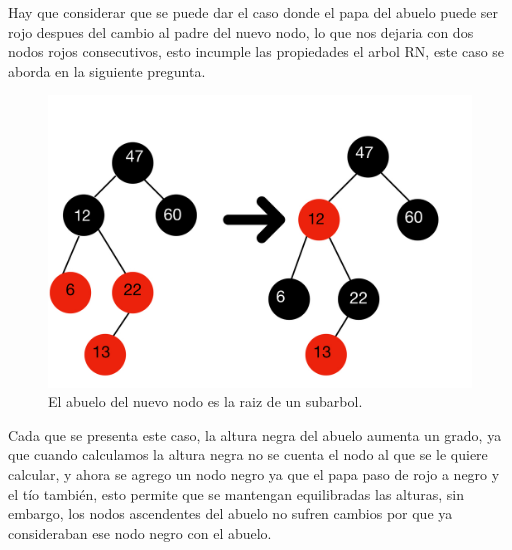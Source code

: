 \documentclass[11pt]{article}
\begin{document}
\begin{itemize}
Hay que considerar que se puede dar el caso donde el papa del abuelo puede ser rojo despues del cambio al padre del nuevo nodo, lo que nos dejaria con dos nodos rojos consecutivos, esto incumple las propiedades el arbol RN, este caso se aborda en la siguiente pregunta.
\begin{figure}
    \centering
    \includegraphics[scale=.2]{IMG-2100.jpg}
    \caption{El abuelo del nuevo nodo es la raiz de un subarbol.}
    \label{}
 \end{figure}
 Cada que se presenta este caso, la altura negra del abuelo aumenta un grado, ya que cuando calculamos la altura negra no se cuenta el nodo al que se le quiere calcular, y ahora se agrego un nodo negro ya que el papa paso de rojo a negro y el tío también, esto permite que se mantengan  equilibradas las alturas, sin embargo, los nodos ascendentes del abuelo no sufren cambios por que ya consideraban ese nodo negro con el abuelo.
\end{itemize}
\end{document}
